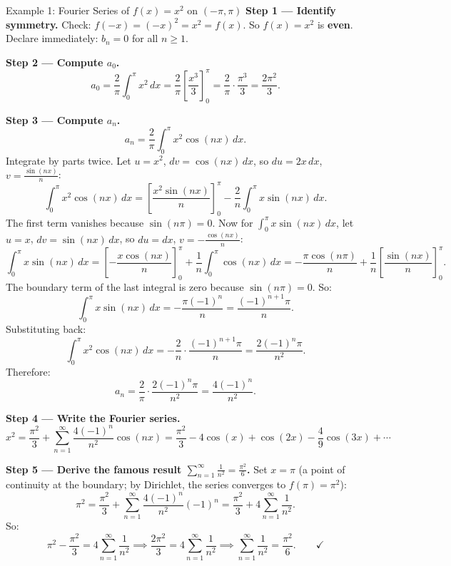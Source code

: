 \documentclass[12pt,a4paper]{article}
\begin{document}
\begin{infobox}{Example 1: Fourier Series of $f(x) = x^2$ on $(-\pi, \pi)$}
\textbf{Step 1 --- Identify symmetry.}
Check: $f(-x) = (-x)^2 = x^2 = f(x)$. So $f(x) = x^2$ is \textbf{even}.
Declare immediately: $b_n = 0$ for all $n \geq 1$.

\medskip
\textbf{Step 2 --- Compute $a_0$.}
\[
  a_0 = \frac{2}{\pi}\int_{0}^{\pi} x^2\,dx
      = \frac{2}{\pi}\left[\frac{x^3}{3}\right]_{0}^{\pi}
      = \frac{2}{\pi}\cdot\frac{\pi^3}{3}
      = \frac{2\pi^2}{3}.
\]

\textbf{Step 3 --- Compute $a_n$.}
\[
  a_n = \frac{2}{\pi}\int_{0}^{\pi} x^2\cos(nx)\,dx.
\]
Integrate by parts twice. Let $u = x^2$, $dv = \cos(nx)\,dx$, so $du = 2x\,dx$,
$v = \frac{\sin(nx)}{n}$:
\[
  \int_{0}^{\pi} x^2\cos(nx)\,dx
  = \left[\frac{x^2\sin(nx)}{n}\right]_{0}^{\pi}
    - \frac{2}{n}\int_{0}^{\pi} x\sin(nx)\,dx.
\]
The first term vanishes because $\sin(n\pi) = 0$. Now for $\int_{0}^{\pi} x\sin(nx)\,dx$,
let $u = x$, $dv = \sin(nx)\,dx$, so $du = dx$, $v = -\frac{\cos(nx)}{n}$:
\[
  \int_{0}^{\pi} x\sin(nx)\,dx
  = \left[-\frac{x\cos(nx)}{n}\right]_{0}^{\pi}
    + \frac{1}{n}\int_{0}^{\pi}\cos(nx)\,dx
  = -\frac{\pi\cos(n\pi)}{n}
    + \frac{1}{n}\left[\frac{\sin(nx)}{n}\right]_{0}^{\pi}.
\]
The boundary term of the last integral is zero because $\sin(n\pi) = 0$. So:
\[
  \int_{0}^{\pi} x\sin(nx)\,dx = -\frac{\pi(-1)^n}{n} = \frac{(-1)^{n+1}\pi}{n}.
\]
Substituting back:
\[
  \int_{0}^{\pi} x^2\cos(nx)\,dx
  = -\frac{2}{n}\cdot\frac{(-1)^{n+1}\pi}{n}
  = \frac{2(-1)^n\pi}{n^2}.
\]
Therefore:
\[
  a_n = \frac{2}{\pi}\cdot\frac{2(-1)^n\pi}{n^2} = \frac{4(-1)^n}{n^2}.
\]

\textbf{Step 4 --- Write the Fourier series.}
\[
  x^2 = \frac{\pi^2}{3} + \sum_{n=1}^{\infty}\frac{4(-1)^n}{n^2}\cos(nx)
       = \frac{\pi^2}{3} - 4\cos(x) + \cos(2x) - \frac{4}{9}\cos(3x) + \cdots
\]

\textbf{Step 5 --- Derive the famous result $\displaystyle\sum_{n=1}^{\infty}\frac{1}{n^2} = \frac{\pi^2}{6}$.}
Set $x = \pi$ (a point of continuity at the boundary; by Dirichlet, the series converges to
$f(\pi) = \pi^2$):
\[
  \pi^2 = \frac{\pi^2}{3} + \sum_{n=1}^{\infty}\frac{4(-1)^n}{n^2}(-1)^n
         = \frac{\pi^2}{3} + 4\sum_{n=1}^{\infty}\frac{1}{n^2}.
\]
So:
\[
  \pi^2 - \frac{\pi^2}{3} = 4\sum_{n=1}^{\infty}\frac{1}{n^2}
  \implies \frac{2\pi^2}{3} = 4\sum_{n=1}^{\infty}\frac{1}{n^2}
  \implies \sum_{n=1}^{\infty}\frac{1}{n^2} = \frac{\pi^2}{6}. \qquad\checkmark
\]
\end{infobox}
\end{document}
